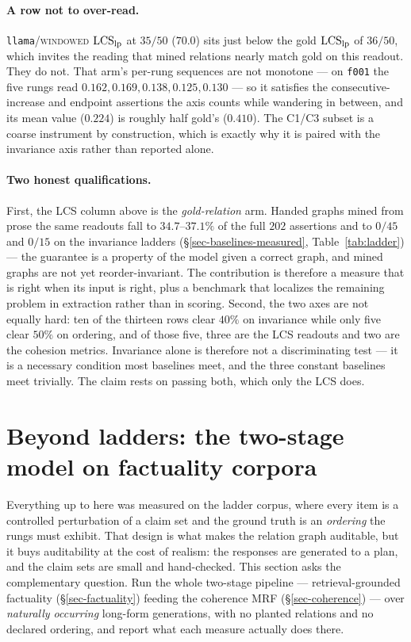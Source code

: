 \paragraph{A row not to over-read.} \texttt{llama}/\textsc{windowed} $\mathrm{LCS}_{\mathrm{lp}}$ at $35/50$ ($70.0$)
sits just below the gold $\mathrm{LCS}_{\mathrm{lp}}$ of $36/50$, which invites the reading that mined relations nearly
match gold on this readout. They do not. That arm's per-rung sequences are not monotone --- on
\texttt{f001} the five rungs read $0.162, 0.169, 0.138, 0.125, 0.130$ --- so it satisfies the
consecutive-increase and endpoint assertions the axis counts while wandering in between, and its mean
value ($0.224$) is roughly half gold's ($0.410$). The C1/C3 subset is a coarse instrument by
construction, which is exactly why it is paired with the invariance axis rather than reported alone.

\paragraph{Two honest qualifications.} First, the LCS column above is the \emph{gold-relation} arm.
Handed graphs mined from prose the same readouts fall to $34.7$--$37.1\%$ of the full $202$ assertions
and to $0/45$ and $0/15$ on the invariance ladders (\S\ref{sec-baselines-measured},
Table~\ref{tab:ladder}) --- the guarantee is a property of the model given a correct graph, and mined
graphs are not yet reorder-invariant. The contribution is therefore a measure that is right when its
input is right, plus a benchmark that localizes the remaining problem in extraction rather than in
scoring. Second, the two axes are not equally hard: ten of the thirteen rows clear $40\%$ on
invariance while only five clear $50\%$ on ordering, and of those five, three are the LCS readouts and
two are the cohesion metrics. Invariance alone is therefore not a discriminating test --- it is a
necessary condition most baselines meet, and the three constant baselines meet trivially. The claim
rests on passing both, which only the LCS does.

\section{Beyond ladders: the two-stage model on factuality corpora}
\label{sec-factuality-corpora}

Everything up to here was measured on the ladder corpus, where every item is a controlled
perturbation of a claim set and the ground truth is an \emph{ordering} the rungs must exhibit. That
design is what makes the relation graph auditable, but it buys auditability at the cost of realism: the
responses are generated to a plan, and the claim sets are small and hand-checked. This section asks the
complementary question. Run the whole two-stage pipeline --- retrieval-grounded factuality
(\S\ref{sec-factuality}) feeding the coherence MRF (\S\ref{sec-coherence}) --- over
\emph{naturally occurring} long-form generations, with no planted relations and no declared ordering,
and report what each measure actually does there.

